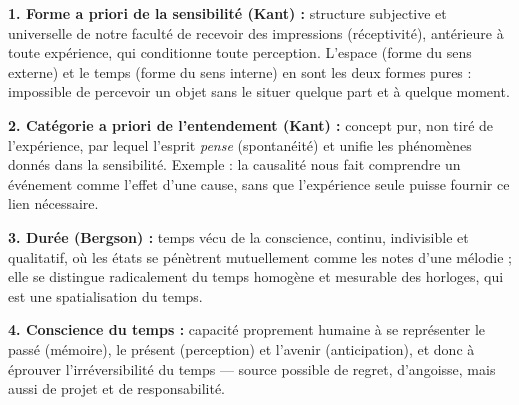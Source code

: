\documentclass[11pt]{article}
\begin{document}
\begin{corrige}

\textbf{1. Forme a priori de la sensibilité (Kant) :} structure subjective et universelle de notre faculté de recevoir des impressions (réceptivité), antérieure à toute expérience, qui conditionne toute perception. L'espace (forme du sens externe) et le temps (forme du sens interne) en sont les deux formes pures : impossible de percevoir un objet sans le situer quelque part et à quelque moment.

\textbf{2. Catégorie a priori de l'entendement (Kant) :} concept pur, non tiré de l'expérience, par lequel l'esprit \emph{pense} (spontanéité) et unifie les phénomènes donnés dans la sensibilité. Exemple : la causalité nous fait comprendre un événement comme l'effet d'une cause, sans que l'expérience seule puisse fournir ce lien nécessaire.

\textbf{3. Durée (Bergson) :} temps vécu de la conscience, continu, indivisible et qualitatif, où les états se pénètrent mutuellement comme les notes d'une mélodie ; elle se distingue radicalement du temps homogène et mesurable des horloges, qui est une spatialisation du temps.

\textbf{4. Conscience du temps :} capacité proprement humaine à se représenter le passé (mémoire), le présent (perception) et l'avenir (anticipation), et donc à éprouver l'irréversibilité du temps — source possible de regret, d'angoisse, mais aussi de projet et de responsabilité.
\end{corrige}
\end{document}
